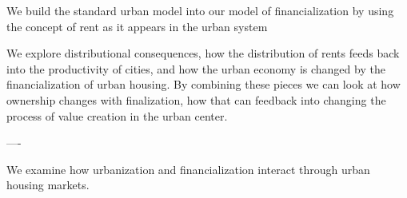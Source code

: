 We build the  standard urban model into our model of financialization by using the concept of rent as it appears in the urban system


We explore distributional consequences, how the distribution of rents feeds back into the productivity of cities, and how the urban economy is changed by the financialization of urban housing. %
By combining these pieces we can look at how ownership changes with finalization, how that can feedback into changing the process of value creation in the urban center.





----







We examine how urbanization and financialization interact through urban housing markets. %



